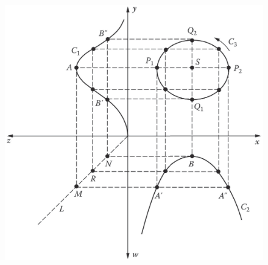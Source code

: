 \documentclass[11pt,a4paper]{article}
\begin{document}
\begin{figure}
\centering
\includegraphics[height=8.cm, angle=0]{Volterra.eps}
\label{fig:Volterra}
\end{figure}
\vfill











\end{document}
